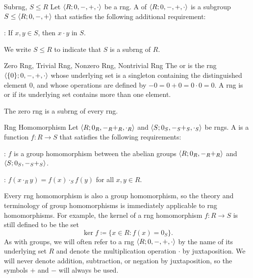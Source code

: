 \documentclass[12pt]{report}
\begin{document}
\begin{dfnbox}{Subrng, $S \le R$}
	Let ${\langle {R; 0, -, +, \cdot} \rangle}$ be a rng. A  of ${\langle {R; 0, -, +, \cdot} \rangle}$ is a subgroup $S \le {\langle {R; 0, -, +} \rangle}$ that satisfies the following additional requirement:
	\begin{dfnitems}
		\item {}: If $x, y \in S$, then $x \cdot y$ in $S$.
	\end{dfnitems}
	We write $S \le R$ to indicate that $S$ is a subrng of $R$.
\end{dfnbox}

\begin{dfnbox}{Zero Rng, Trivial Rng, Nonzero Rng, Nontrivial Rng}
	The  or  is the rng ${\langle { \{0\}; 0, -, +, \cdot } \rangle}$ whose underlying set is a singleton containing the distinguished element $0$, and whose operations are defined by $-0 = 0 + 0 = 0 \cdot 0 = 0$. A rng is  or  if its underlying set contains more than one element.
\end{dfnbox}

The zero rng is a subrng of every rng.

\begin{dfnbox}{Rng Homomorphism}
	Let ${\langle {R; 0_R, -_R +_R, \cdot_R} \rangle}$ and ${\langle {S; 0_S, -_S +_S, \cdot_S} \rangle}$ be rngs. A  is a function $f: R \to S$ that satisfies the following requirements:
	\begin{dfnitems}
		\item {}: $f$ is a group homomorphism between the abelian groups ${\langle {R; 0_R, -_R +_R} \rangle}$ and ${\langle {S; 0_S, -_S +_S} \rangle}$.
		\item {}: $f(x \cdot_R y) = f(x) \cdot_S f(y)$ for all $x, y \in R$.
	\end{dfnitems}
\end{dfnbox}

Every rng homomorphism is also a group homomorphism, so the theory and terminology of group homomorphisms is immediately applicable to rng homomorphisms. For example, the kernel of a rng homomorphism $f: R \to S$ is still defined to be the set
\[ \ker f \coloneq \{ x \in R : f(x) = 0_S \}. \]
As with groups, we will often refer to a rng ${\langle {R; 0, -, +, \cdot} \rangle}$ by the name of its underlying set $R$ and denote the multiplication operation $\cdot$ by juxtaposition. We will never denote addition, subtraction, or negation by juxtaposition, so the symbols $+$ and $-$ will always be used.
\end{document}
